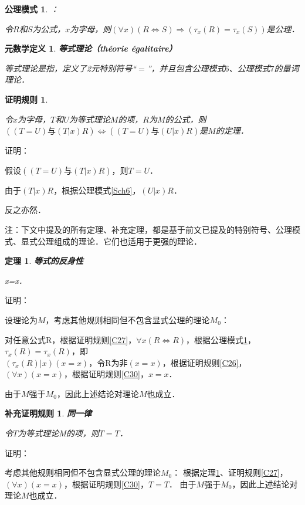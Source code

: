 \documentclass[12pt, a4paper, oneside]{book}
\newtheorem{metadef}{元数学定义}
\newtheorem{C}{证明规则}
\newtheorem{Ccor}{补充证明规则}
\newtheorem{Sch}{公理模式}
\newtheorem{theo}{定理}
\begin{document}
			\begin{Sch}\label{Sch7}：
				\hfill\par
				令$R$和$S$为公式，$x$为字母，则$(\forall x)(R\Leftrightarrow S)\Rightarrow(\tau_x(R)=\tau_x(S))$是公理．
			\end{Sch}

			\begin{metadef}
				\textbf{等式理论（théorie égalitaire）}
				\par
				等式理论是指，定义了2元特别符号“$=$”，并且包含公理模式$6$、公理模式$7$的量词理论．
			\end{metadef}

			\begin{C}\label{C43}
				\hfill\par
				令$x$为字母，$T$和$U$为等式理论$M$的项，$R$为$M$的公式，则$((T=U)\text{与}(T|x)R)\Leftrightarrow((T=U)\text{与}(U|x)R)$是$M$的定理．
			\end{C}
			证明：
			\par
			假设$((T=U)\text{与}(T|x)R)$，则$T=U$．
			\par
			由于$(T|x)R$，根据公理模式\ref{Sch6}，$(U|x)R$．
			\par
			反之亦然．

			注：下文中提及的所有定理、补充定理，都是基于前文已提及的特别符号、公理模式、显式公理组成的理论．它们也适用于更强的理论．
			\begin{theo}\label{theo1}
				\textbf{等式的反身性}
				\par
				x=x．
			\end{theo}
			证明：
			\par
			设理论为$M$，考虑其他规则相同但不包含显式公理的理论$M_0$：
			\par
			对任意公式R，根据证明规则\ref{C27}，$\forall x(R\Leftrightarrow R)$，根据公理模式\ref{Sch7}，$\tau_x(R)=\tau_x(R)$，即\\$(\tau_x(R)|x)(x=x)$，令R为$\text{非}(x=x)$，根据证明规则\ref{C26}，$(\forall x)(x=x)$，根据证明规则\ref{C30}，$x=x$．
			\par
			由于$M$强于$M_0$，因此上述结论对理论$M$也成立．

			\begin{Ccor}\label{Ccor7}
				\textbf{同一律}
				\par
				令$T$为等式理论M的项，则$T=T$．
			\end{Ccor}
			证明：
			\par
			考虑其他规则相同但不包含显式公理的理论$M_0$：
			根据定理\ref{theo1}、证明规则\ref{C27}，$(\forall x)(x=x)$，根据证明规则\ref{C30}，$T=T$．
			由于$M$强于$M_0$，因此上述结论对理论$M$也成立．
			
\end{document}
